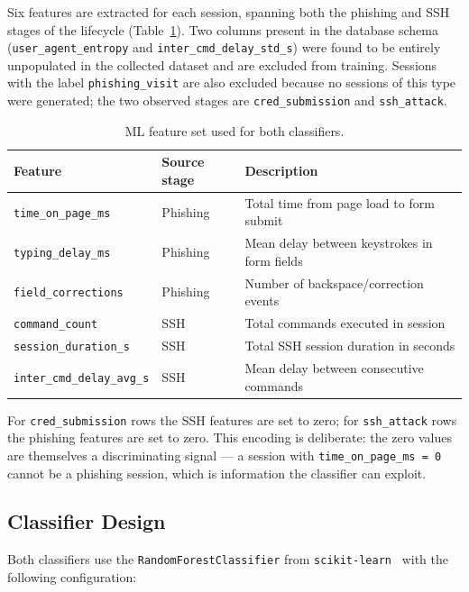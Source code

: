 Six features are extracted for each session, spanning both the phishing and SSH
stages of the lifecycle (Table~\ref{tab:features}). Two columns present in the
database schema (\texttt{user\_agent\_entropy} and
\texttt{inter\_cmd\_delay\_std\_s}) were found to be entirely unpopulated in the
collected dataset and are excluded from training. Sessions with the label
\texttt{phishing\_visit} are also excluded because no sessions of this type were
generated; the two observed stages are \texttt{cred\_submission} and
\texttt{ssh\_attack}.

\begin{table}[h]
\centering
\caption{ML feature set used for both classifiers.}
\label{tab:features}
\begin{tabular}{lll}
\hline
\textbf{Feature} & \textbf{Source stage} & \textbf{Description} \\
\hline
\texttt{time\_on\_page\_ms}       & Phishing & Total time from page load to form submit \\
\texttt{typing\_delay\_ms}        & Phishing & Mean delay between keystrokes in form fields \\
\texttt{field\_corrections}       & Phishing & Number of backspace/correction events \\
\texttt{command\_count}           & SSH      & Total commands executed in session \\
\texttt{session\_duration\_s}     & SSH      & Total SSH session duration in seconds \\
\texttt{inter\_cmd\_delay\_avg\_s} & SSH     & Mean delay between consecutive commands \\
\hline
\end{tabular}
\end{table}

For \texttt{cred\_submission} rows the SSH features are set to zero; for
\texttt{ssh\_attack} rows the phishing features are set to zero. This encoding
is deliberate: the zero values are themselves a discriminating signal — a session
with \texttt{time\_on\_page\_ms = 0} cannot be a phishing session, which is
information the classifier can exploit.

\subsection{Classifier Design}

Both classifiers use the \texttt{RandomForestClassifier} from
\texttt{scikit-learn}~\cite{MDR25} with the following configuration:


